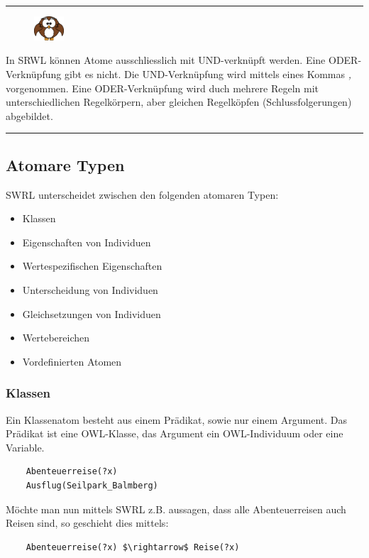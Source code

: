 \noindent\rule[1ex]{\textwidth}{1pt}
\begin{figure}
    \vspace{-12pt}
    \includegraphics[width=0.1\textwidth]{bilder/owl.png}
\end{figure}
In SRWL können Atome ausschliesslich mit UND-verknüpft werden. Eine ODER-Verknüpfung gibt es nicht. Die UND-Verknüpfung wird mittels eines Kommas \textit{,} vorgenommen. Eine ODER-Verknüpfung wird duch mehrere Regeln mit unterschiedlichen Regelkörpern, aber gleichen Regelköpfen (Schlussfolgerungen) abgebildet.

\noindent\rule[1ex]{\textwidth}{1pt}

\subsection{Atomare Typen}
\label{subsec:swrl_aufbau_atomaretypen}
SWRL unterscheidet zwischen den folgenden atomaren Typen:
\begin{itemize}
    \item Klassen
    \item Eigenschaften von Individuen
    \item Wertespezifischen Eigenschaften
    \item Unterscheidung von Individuen
    \item Gleichsetzungen von Individuen
    \item Wertebereichen
    \item Vordefinierten Atomen
\end{itemize}

\subsubsection{Klassen}
\label{ssubsec:swrl_aufbau_atomaretypen_klassen}
Ein Klassenatom besteht aus einem Prädikat, sowie nur einem Argument. Das Prädikat ist eine OWL-Klasse, das Argument ein OWL-Individuum oder eine Variable.
\lstset{language=XML}
\begin{lstlisting}
    Abenteuerreise(?x)
    Ausflug(Seilpark_Balmberg)
\end{lstlisting}

Möchte man nun mittels SWRL z.B. aussagen, dass alle Abenteuerreisen auch Reisen sind, so geschieht dies mittels:
\lstset{language=XML}
\begin{lstlisting}
    Abenteuerreise(?x) $\rightarrow$ Reise(?x)
\end{lstlisting}

